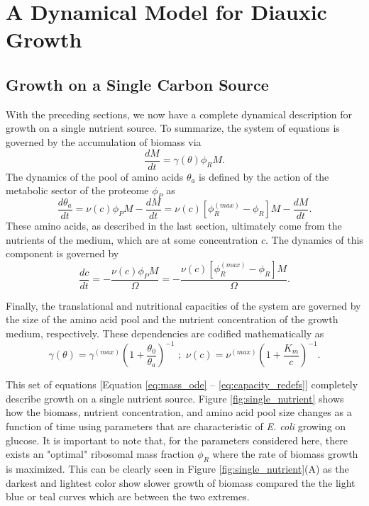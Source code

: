 \documentclass[letterpaper, 11pt]{article}
\begin{document}
\section{A Dynamical Model for Diauxic Growth}
\subsection{Growth on a Single Carbon Source}
With the preceding sections, we now have a complete dynamical description for
growth on a single nutrient source. To summarize, the system of equations is
governed by the accumulation of biomass via 
\begin{equation}
    \frac{dM}{dt} = \gamma(\theta) \phi_R M.
    \label{eq:mass_ode}
\end{equation} 
The dynamics of the pool of amino acids $\theta_a$ is defined by the action of 
the metabolic sector of the proteome $\phi_P$ as 
\begin{equation}
\frac{d\theta_a}{dt} = \nu(c)\phi_P M - \frac{dM}{dt} = \nu(c)\left[\phi_R^{(max)} - \phi_R\right]M - \frac{dM}{dt}.
\end{equation}
These amino acids, as described in the last section, ultimately come from the
nutrients of the medium, which are at some concentration $c$. The dynamics of
this component is governed by 
\begin{equation}
    \frac{dc}{dt} = -\frac{\nu(c)\phi_P M}{\Omega} = -\frac{\nu(c)\left[\phi_R^{(max)} - \phi_R\right]M}{\Omega}.
\end{equation}

Finally, the translational and nutritional capacities of the system are governed
by the size of the amino acid pool and the nutrient concentration of the growth
medium, respectively. These dependencies are codified mathematically as 
\begin{equation}
   \gamma(\theta) = \gamma^{(max)}\left(1 + \frac{\theta_0}{\theta_a}\right)^{-1}\,\,;\,\, \nu(c) = \nu^{(max)}\left(1 + \frac{K_m}{c}\right)^{-1}.
   \label{eq:capacity_redefs}
\end{equation}

This set of equations [Equation \eqref{eq:mass_ode} --
\eqref{eq:capacity_redefs}] completely describe growth on a single nutrient
source. Figure \ref{fig:single_nutrient} shows how the biomass, nutrient
concentration, and amino acid pool size changes as a function of time using
parameters that are characteristic of \textit{E. coli} growing on glucose. It is
important to note that, for the parameters considered here, there exists an
"optimal" ribosomal mass fraction $\phi_R$ where the rate of biomass growth is 
maximized. This can be clearly seen in Figure \ref{fig:single_nutrient}(A) as 
the darkest and lightest color show slower growth of biomass compared the 
the light blue or teal curves which are between the two extremes.  
\end{document}
